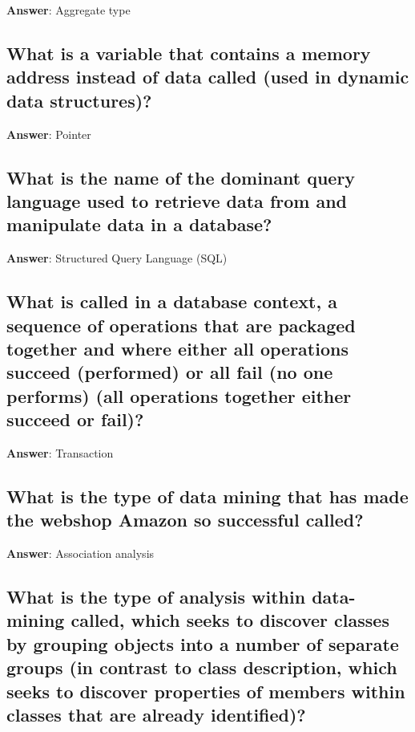 \documentclass[a4paper,11pt,oneside]{article}
\begin{document}
\begin{sloppypar}
\label{q:52:sa:en:True}

\textbf{Answer}: Aggregate type



\subsection{What is a variable that contains a memory address instead of data called (used in dynamic data structures)?}

\label{q:53:sa:en:True}

\textbf{Answer}: Pointer



\subsection{What is the name of the dominant query language used to retrieve data from and manipulate data in a database?}

\label{q:54:sa:en:True}

\textbf{Answer}: Structured Query Language (SQL)



\subsection{What is called in a database context, a sequence of operations that are packaged together and where either all operations succeed (performed) or all fail (no one performs) (all operations together either succeed or fail)?}

\label{q:55:sa:en:True}

\textbf{Answer}: Transaction



\subsection{What is the type of data mining that has made the webshop Amazon so successful called?}

\label{q:56:sa:en:True}

\textbf{Answer}: Association analysis



\subsection{What is the type of analysis within data-mining called, which seeks to discover classes by grouping objects into a number of separate groups (in contrast to class description, which seeks to discover properties of members within classes that are already identified)?}


\end{sloppypar}
\end{document}
